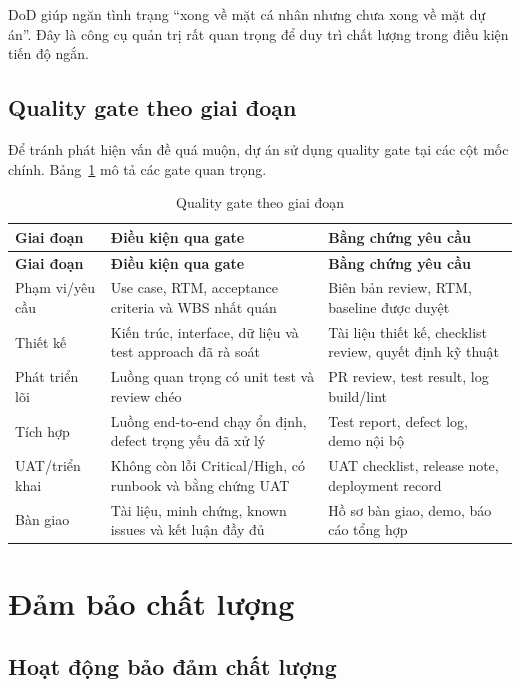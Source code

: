 DoD giúp ngăn tình trạng ``xong về mặt cá nhân nhưng chưa xong về mặt dự án''. Đây là công cụ quản trị rất quan trọng để duy trì chất lượng trong điều kiện tiến độ ngắn.

\subsection{Quality gate theo giai đoạn}

Để tránh phát hiện vấn đề quá muộn, dự án sử dụng quality gate tại các cột mốc chính. Bảng~\ref{tab:quality-gates} mô tả các gate quan trọng.

\begin{longtable}{| p{3.2cm} | p{5.3cm} | p{4.2cm} |}
\caption{Quality gate theo giai đoạn}\label{tab:quality-gates}\\
\hline
\textbf{Giai đoạn} & \textbf{Điều kiện qua gate} & \textbf{Bằng chứng yêu cầu} \\
\hline
\endfirsthead
\hline
\textbf{Giai đoạn} & \textbf{Điều kiện qua gate} & \textbf{Bằng chứng yêu cầu} \\
\hline
\endhead
Phạm vi/yêu cầu & Use case, RTM, acceptance criteria và WBS nhất quán & Biên bản review, RTM, baseline được duyệt \\ \hline
Thiết kế & Kiến trúc, interface, dữ liệu và test approach đã rà soát & Tài liệu thiết kế, checklist review, quyết định kỹ thuật \\ \hline
Phát triển lõi & Luồng quan trọng có unit test và review chéo & PR review, test result, log build/lint \\ \hline
Tích hợp & Luồng end-to-end chạy ổn định, defect trọng yếu đã xử lý & Test report, defect log, demo nội bộ \\ \hline
UAT/triển khai & Không còn lỗi Critical/High, có runbook và bằng chứng UAT & UAT checklist, release note, deployment record \\ \hline
Bàn giao & Tài liệu, minh chứng, known issues và kết luận đầy đủ & Hồ sơ bàn giao, demo, báo cáo tổng hợp \\
\hline
\end{longtable}

\iffalse
\section{Đảm bảo chất lượng}

\subsection{Hoạt động bảo đảm chất lượng}

